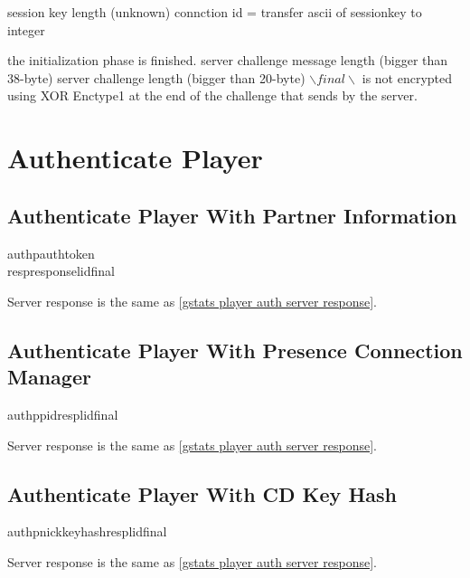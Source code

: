 \documentclass[oneside,titlepage,a4paper]{Definition/retrospy} %
\begin{document}
session key length (unknown)
connction id = transfer ascii of sessionkey to integer

the initialization phase is finished.
server challenge message length (bigger than 38-byte)
server challenge length (bigger than 20-byte)
$ \backslash final \backslash $ is not encrypted using XOR Enctype1 at the end of the challenge that sends by the server.

\section{Authenticate Player}

\subsection{Authenticate Player With Partner Information}
\ClientRequest
\begin{mybox}
	\tbs authp\tbs\tbs authtoken\tbs<authtoken string>\\\tbs resp\tbs response\tbs<response string>\tbs lid\tbs <local id>\tbs final\tbs
\end{mybox}
\ServerResponse

Server response is the same as \ref{gstats player auth server response}.
\subsection{Authenticate Player With Presence Connection Manager}
\ClientRequest
\begin{mybox}
	\tbs authp\tbs\tbs pid\tbs<profile id>\tbs resp\tbs<response string>\tbs lid\tbs <local id>\tbs final\tbs
\end{mybox}
\ServerResponse

Server response is the same as \ref{gstats player auth server response}.
\subsection{Authenticate Player With CD Key Hash}
\ClientRequest
\begin{mybox}
	\tbs authp\tbs\tbs nick\tbs<nick name>\tbs keyhash\tbs<cd key hash>\tbs resp\tbs <response string>\tbs lid\tbs<local id>\tbs final\tbs
\end{mybox}
\ServerResponse

Server response is the same as \ref{gstats player auth server response}.
\end{document}
